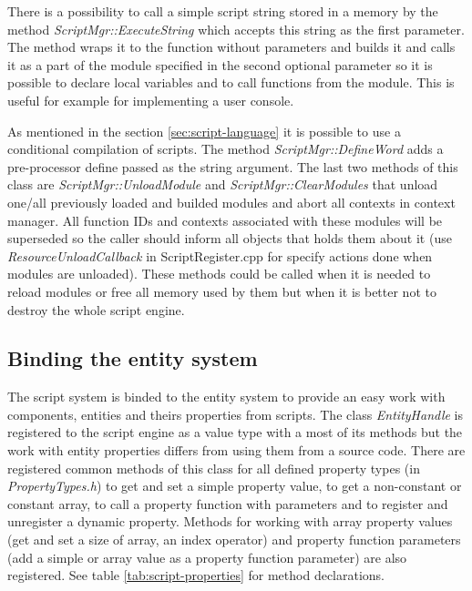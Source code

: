 There is a possibility to call a simple script string stored in a memory by the method \emph{ScriptMgr::ExecuteString} which accepts this string as the first parameter. The method wraps it to the function without parameters and builds it and calls it as a part of the module specified in the second optional parameter so it is possible to declare local variables and to call functions from the module. This is useful for example for implementing a user console.

As mentioned in the section \ref{sec:script-language} it is possible to use a conditional compilation of scripts. The method \emph{ScriptMgr::DefineWord} adds a pre-processor define passed as the string argument. The last two methods of this class are \emph{ScriptMgr::UnloadModule} and \emph{ScriptMgr::ClearModules} that unload one/all previously loaded and builded modules and abort all contexts in context manager. All function IDs and contexts associated with these modules will be superseded so the caller should inform all objects that holds them about it (use \emph{ResourceUnloadCallback} in ScriptRegister.cpp for specify actions done when modules are unloaded). These methods could be called when it is needed to reload modules or free all memory used by them but when it is better not to destroy the whole script engine.

\subsection{Binding the entity system}
\label{sub:script-entity}

The script system is binded to the entity system to provide an easy work with components, entities and theirs properties from scripts. The class \emph{EntityHandle} is registered to the script engine as a value type with a most of its methods but the work with entity properties differs from using them from a source code. There are registered common methods of this class for all defined property types (in \emph{PropertyTypes.h}) to get and set a simple property value, to get a non-constant or constant array, to call a property function with parameters and to register and unregister a dynamic property. Methods for working with array property values (get and set a size of array, an index operator) and property function parameters (add a simple or array value as a property function parameter) are also registered. See table \ref{tab:script-properties} for method declarations.

